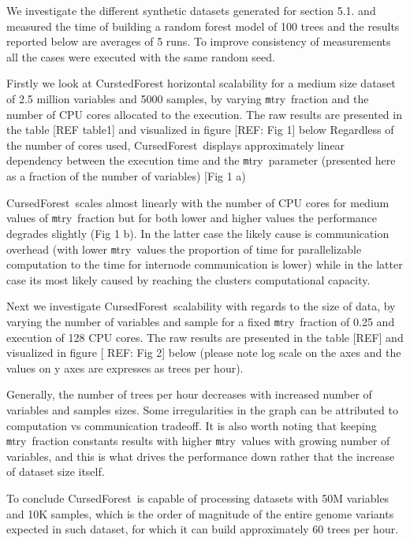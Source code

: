 \documentclass[10pt,letterpaper]{article}
\newcommand{\cursedforest}{{\sc CursedForest}}
\newcommand{\mtry}{{\texttt mtry}}
\begin{document}
We investigate the different synthetic datasets generated for section 5.1. and measured the time of building a random forest model of 100 trees and the results reported below are averages of 5 runs. To improve consistency of measurements all the cases were executed with the same random seed.

Firstly we look at CurstedForest horizontal scalability for a medium size dataset of 2.5 million variables and 5000 samples, by varying \mtry\ fraction and the number of CPU cores allocated to the execution. The raw results are presented in the table [REF table1] and visualized in figure [REF: Fig 1] below
Regardless of the number of cores used, \cursedforest\ displays approximately linear dependency between the execution time and the \mtry\ parameter (presented here as a fraction of the number of variables) [Fig 1 a)

\cursedforest{}ales almost linearly with the number of CPU cores for medium values of \mtry\ fraction but for both lower and higher values the performance degrades slightly (Fig 1 b). In the latter case the likely cause is communication overhead (with lower \mtry\ values the proportion of time for parallelizable computation to the time for internode communication is lower) while in the latter case its most likely caused by reaching the clusters computational capacity.

Next we investigate \cursedforest{}alability with regards to the size of data, by varying the number of variables and sample for a fixed \mtry\ fraction of 0.25 and execution of 128 CPU cores. The raw results are presented in the table [REF] and visualized in figure [ REF: Fig 2] below (please note log scale on the axes and the values on y axes are expresses as trees per hour).

Generally, the number of trees per hour decreases with increased number of variables and samples sizes. Some irregularities in the graph can be attributed to computation vs communication tradeoff. It is also worth noting that keeping \mtry\ fraction constants results with higher \mtry\ values with growing number of variables, and this is what drives the performance down rather that the increase of dataset size itself.


To conclude \cursedforest\ is capable of processing datasets with 50M variables and 10K samples, which is the order of magnitude of the entire genome variants expected in such dataset, for which it can build approximately 60 trees per hour.
\end{document}

